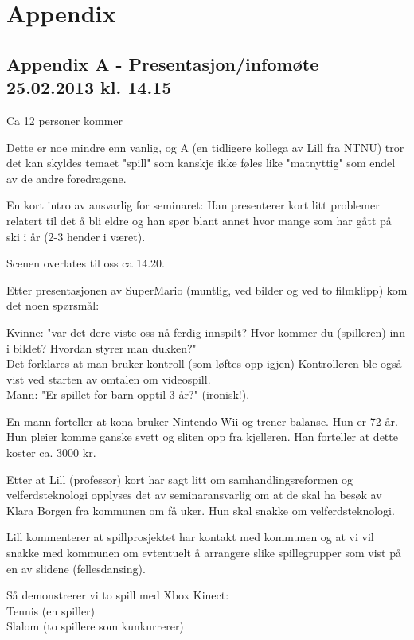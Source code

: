 \appendix
\chapter*{Appendix}

\section*{Appendix A - Presentasjon/infomøte 25.02.2013 kl. 14.15}
\label{A}

Ca 12 personer kommer

Dette er noe mindre enn vanlig, og A (en tidligere kollega av Lill fra NTNU) tror det kan skyldes temaet "spill" som kanskje ikke føles like "matnyttig" som endel av de andre foredragene.

En kort intro av ansvarlig for seminaret: Han presenterer kort litt problemer relatert til det å bli eldre og han spør blant annet hvor mange som har gått på ski i år (2-3 hender i været).

Scenen overlates til oss ca 14.20.

Etter presentasjonen av SuperMario (muntlig, ved bilder og ved to filmklipp) kom det noen spørsmål:

Kvinne: "var det dere viste oss nå ferdig innspilt? Hvor kommer du (spilleren) inn i bildet? Hvordan styrer man dukken?" \\
Det forklares at man bruker kontroll (som løftes opp igjen)
Kontrolleren ble også vist ved starten av omtalen om videospill. \\
Mann: "Er spillet for barn opptil 3 år?" (ironisk!).

En mann forteller at kona bruker Nintendo Wii og trener balanse. Hun er 72 år. Hun pleier komme ganske svett og sliten opp fra kjelleren. Han forteller at dette koster ca. 3000 kr.

Etter at Lill (professor) kort har sagt litt om samhandlingsreformen og velferdsteknologi opplyses det av seminaransvarlig om at de skal ha besøk av Klara Borgen fra kommunen om få uker. Hun skal snakke om velferdsteknologi.

Lill kommenterer at spillprosjektet har kontakt med kommunen og at vi vil snakke med kommunen om evtentuelt å arrangere slike spillegrupper 
som vist på en av slidene (fellesdansing).

Så demonstrerer vi to spill med Xbox Kinect: \\
Tennis (en spiller)\\
Slalom (to spillere som kunkurrerer)

